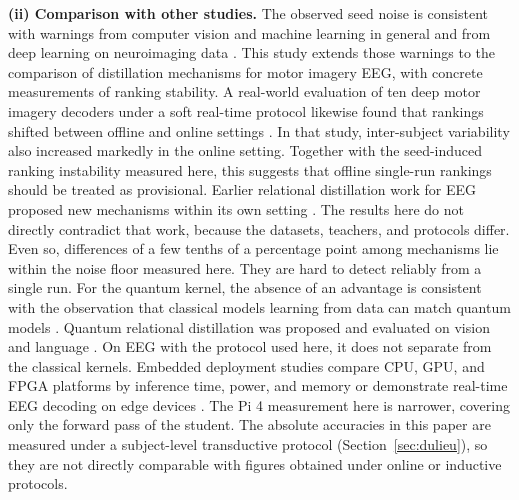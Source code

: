 \textbf{(ii) Comparison with other studies.} The observed seed noise is
consistent with warnings from computer vision and machine learning in
general \cite{picard2021torch, bouthillier2021accounting} and from deep
learning on neuroimaging data \cite{delpup2024toward}. This study extends
those warnings to the comparison of distillation mechanisms for motor
imagery EEG, with concrete measurements of ranking stability. A
real-world evaluation of ten deep motor imagery decoders under a soft
real-time protocol likewise found that rankings shifted between offline and online settings
\cite{sedinzakuna2025realworld}. In that study, inter-subject variability
also increased markedly in the online setting. Together with the seed-induced ranking
instability measured here, this suggests that offline single-run rankings
should be treated as provisional. Earlier
relational distillation work for EEG proposed new mechanisms within its
own setting \cite{huang2024enhancing, wu2026multilevel}. The results
here do not directly contradict that work, because the datasets,
teachers, and protocols differ. Even so, differences of a few tenths of
a percentage point among mechanisms lie within the noise floor measured
here. They are hard to detect reliably from a single run. For the
quantum kernel, the absence of an advantage is consistent with the
observation that classical models learning from data can match quantum
models \cite{huang2021power}. Quantum relational distillation was
proposed and evaluated on vision and language \cite{liu2025quantum}. On
EEG with the protocol used here, it does not separate from the classical
kernels. Embedded deployment studies compare CPU, GPU, and FPGA platforms
by inference time, power, and memory \cite{pacini2024design} or
demonstrate real-time EEG decoding on edge devices
\cite{sen2025lowlatency}. The Pi 4 measurement here is narrower, covering
only the forward pass of the student. The absolute accuracies in this paper are measured under a
subject-level transductive protocol (Section~\ref{sec:dulieu}), so they
are not directly comparable with figures obtained under online or
inductive protocols.

